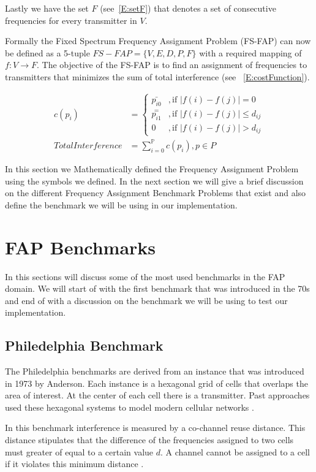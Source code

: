 Lastly we have the set $F$ (see~\ref{E:setF}) that denotes a set of consecutive frequencies for every transmitter in $V$\cite{FAPOrientationModel,TabuMontemanniSmith}.

Formally the Fixed Spectrum Frequency Assignment Problem (FS-FAP) can now be defined as a 5-tuple \(FS-FAP = \{V,E,D,P,F\}\) with a required mapping of \(f: V \rightarrow F\)\cite{TabuMontemanniSmith}. The objective of the FS-FAP is to find an assignment of frequencies to transmitters that minimizes the sum of total interference (see ~\ref{E:costFunction}).

\begin{align} 
 c(p_i) &= 
 \begin{cases}
	\bar{p_{i0}} &,\text{if $|f(i) - f(j)| = 0$}\\
	\overset{=}{p_{i1}} &, \text{if $|f(i) - f(j)| \leqslant d_{ij}$}\\
	0 &,\text{if $|f(i) - f(j)| > d_{ij}$}
 \end{cases}\\
 \label{E:costFunction}
 Total Interference &= \sum^\mathbb{P}_{i = 0}c(p_i),p \in P 
\end{align}

In this section we Mathematically defined the Frequency Assignment Problem using the symbols we defined. In the next section we will give a brief discussion on the different Frequency Assignment Benchmark Problems that exist and also define the benchmark we will be using in our implementation.
\section{FAP Benchmarks}
\label{sec:FAPBenchmarks}
In this sections will discuss some of the most used benchmarks in the FAP domain. We will start of with the first benchmark that was introduced in the 70s and end of with a discussion on the benchmark we will be using to test our implementation.
\subsection{Philedelphia Benchmark}
The Philedelphia benchmarks are derived from an instance that was introduced in 1973 by Anderson. Each instance is a hexagonal grid of cells that overlaps the area of interest. At the center of each cell there is a transmitter. Past approaches used these hexagonal systems to model modern cellular networks \cite{Karen2004,ExactMIFAP}.

In this benchmark interference is measured by a co-channel reuse distance. This distance stipulates that the difference of the frequencies  assigned to two cells must greater of equal to a certain value $d$. A channel cannot be assigned to a cell if it violates this minimum distance \cite{Karen2004,ExactMIFAP}.

